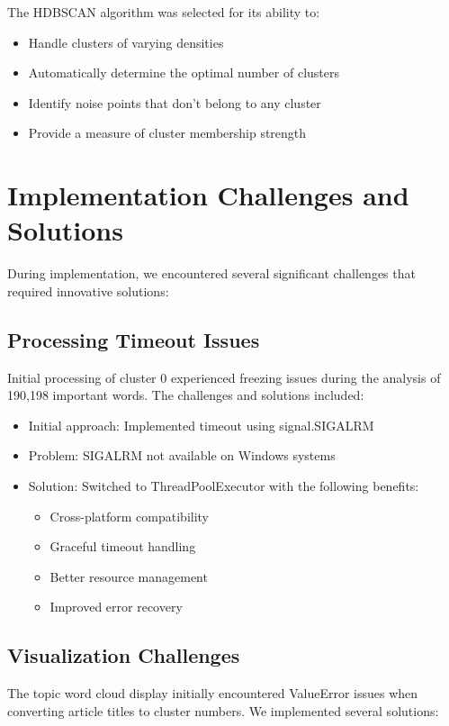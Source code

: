 \documentclass[conference]{IEEEtran}
\begin{document}
The HDBSCAN algorithm was selected for its ability to:
\begin{itemize}
    \item Handle clusters of varying densities
    \item Automatically determine the optimal number of clusters
    \item Identify noise points that don't belong to any cluster
    \item Provide a measure of cluster membership strength
\end{itemize}

\section{Implementation Challenges and Solutions}
During implementation, we encountered several significant challenges that required innovative solutions:

\subsection{Processing Timeout Issues}
Initial processing of cluster 0 experienced freezing issues during the analysis of 190,198 important words. The challenges and solutions included:

\begin{itemize}
    \item Initial approach: Implemented timeout using signal.SIGALRM
    \item Problem: SIGALRM not available on Windows systems
    \item Solution: Switched to ThreadPoolExecutor with the following benefits:
        \begin{itemize}
            \item Cross-platform compatibility
            \item Graceful timeout handling
            \item Better resource management
            \item Improved error recovery
        \end{itemize}
\end{itemize}

\subsection{Visualization Challenges}
The topic word cloud display initially encountered ValueError issues when converting article titles to cluster numbers. We implemented several solutions:
\end{document}

